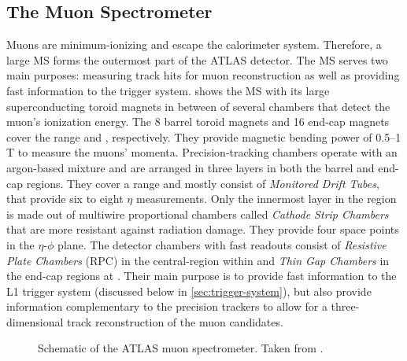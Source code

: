 \subsection{The Muon Spectrometer}
Muons are minimum-ionizing and escape the calorimeter system. 
Therefore, a large MS forms the outermost part of the ATLAS detector. 
The MS serves two main purposes: measuring track hits for muon reconstruction as well as providing fast information to the trigger system.
 shows the MS with its large superconducting toroid magnets in between of several chambers that detect the muon's ionization energy.
The 8 barrel toroid magnets and 16 end-cap magnets cover the range  and , respectively. They provide magnetic bending power of \numrange{0.5}{1}\,T to measure the muons' momenta. Precision-tracking chambers operate with an argon-based mixture and are arranged in three layers in both the barrel and end-cap regions. They cover a range  and mostly consist of \emph{Monitored Drift Tubes}, that provide six to eight $\eta$ measurements. Only the innermost layer in the region  is made out of multiwire proportional chambers called \emph{Cathode Strip Chambers} that are more resistant against radiation damage. They provide four space points in the $\eta$-$\phi$ plane. The detector chambers with fast readouts consist of \emph{Resistive Plate Chambers} (RPC) in the central-region within  and \emph{Thin Gap Chambers} in the end-cap regions at . 
Their main purpose is to provide fast information to the L1 trigger system (discussed below in \cref{sec:trigger-system}), but also provide information complementary to the precision trackers to allow for a three-dimensional track reconstruction of the muon candidates.



\begin{figure}
    \caption{Schematic of the ATLAS muon spectrometer. Taken from .}
    \label{fig:ATLASmuonspectrometer}
\end{figure}


